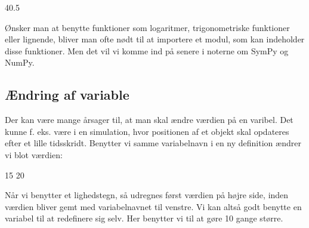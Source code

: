\documentclass[letterpaper,10pt,english]{jupyterBook}
\begin{document}
\begin{sphinxVerbatim}[commandchars=\\\{\}]
40.5
\end{sphinxVerbatim}

Ønsker man at benytte funktioner som logaritmer, trigonometriske funktioner eller lignende, bliver man ofte nødt til at importere et modul, som kan indeholder disse funktioner. Men det vil vi komme ind på senere i noterne om SymPy og NumPy.


\subsection{Ændring af variable}
\label{\detokenize{notebooks/Basal_python:aendring-af-variable}}
Der kan være mange årsager til, at man skal ændre værdien på en varibel. Det kunne f. eks. være i en simulation, hvor positionen af et objekt skal opdateres efter et lille tidsskridt. Benytter vi samme variabelnavn i en ny definition ændrer vi blot værdien:

\begin{sphinxVerbatim}[commandchars=\\\{\}]
  
 
   
 
\end{sphinxVerbatim}

\begin{sphinxVerbatim}[commandchars=\\\{\}]
15
20
\end{sphinxVerbatim}

Når vi benytter et lighedstegn, så udregnes først værdien på højre side, inden værdien bliver gemt med variabelnavnet til venstre. Vi kan altså godt benytte en variabel til at redefinere sig selv. Her benytter vi  til at gøre  10 gange større.

\begin{sphinxVerbatim}[commandchars=\\\{\}]
  
      
     
\end{sphinxVerbatim}
\end{document}
